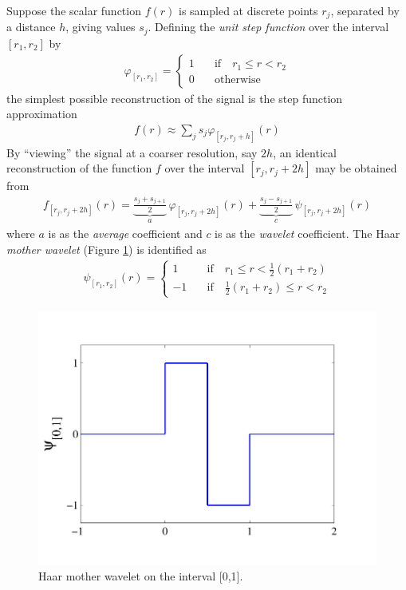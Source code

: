 \documentclass[11pt]{book}
\begin{document}
Suppose the scalar function $f(r)$ is sampled at discrete points $r_j$, separated by a distance $h$, giving values $s_j$.  Defining the \emph{unit step function} over the interval $[r_1,r_2]$ by
\begin{eqnarray}
\varphi_{[r_1,r_2]} = \left\{ \begin{array}{ll} 1 & \quad \mbox{if} \quad r_1 \le r < r_2 \\ 0 & \quad \mbox{otherwise} \end{array} \right.
\end{eqnarray}
the simplest possible reconstruction of the signal is the step function approximation
\begin{eqnarray}
f(r) \approx \sum_j s_j \varphi_{[r_j,r_j+h]}(r)
\end{eqnarray}
By ``viewing'' the signal at a coarser resolution, say $2h$, an identical reconstruction of the function $f$ over the interval $[r_j,r_j+2h]$ may be obtained from
\begin{eqnarray}
\label{eqn_wavelet_decomp}
f_{[r_j,r_j+2h]}(r) = \underbrace{\mbox{$\frac{s_j+s_{j+1}}{2}$}}_a \,\varphi_{[r_j,r_j+2h]}(r) + \underbrace{\mbox{$\frac{s_j-s_{j+1}}{2}$}}_c \,\psi_{[r_j,r_j+2h]}(r)
\end{eqnarray}
where $a$ is as the \emph{average} coefficient and $c$ is as the \emph{wavelet} coefficient.  The Haar \emph{mother wavelet} (Figure \ref{fig_haar_mother}) is identified as
\begin{eqnarray}
\psi_{[r_1,r_2]}(r) = \left\{ \begin{array}{ll} 1 & \quad \mbox{if} \quad r_1\le r < \frac{1}{2}(r_1+r_2) \\ -1 & \quad \mbox{if} \quad \frac{1}{2}(r_1+r_2)\le r < r_2 \end{array} \right.
\end{eqnarray}

\begin{figure}[ht]
\centering
\includegraphics[width=0.5\linewidth]{FIGURES/haar_mother}
\vskip-0.2cm
\caption{Haar mother wavelet on the interval [0,1].}
\label{fig_haar_mother}
\end{figure}
\end{document}
